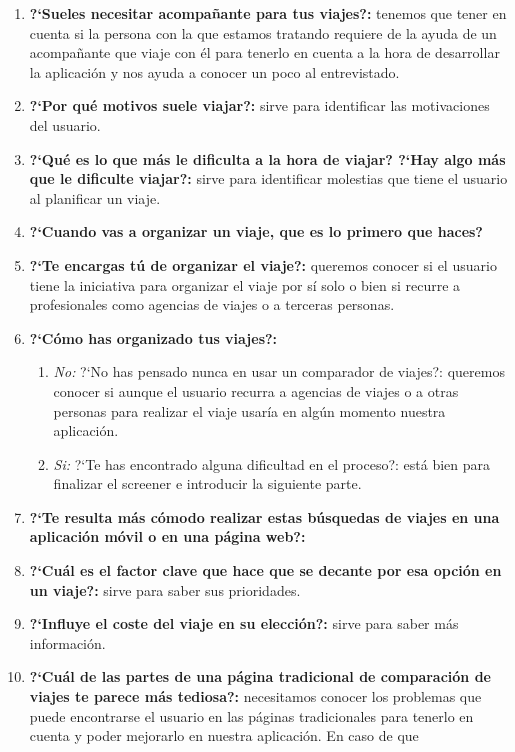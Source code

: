\begin{enumerate}
    \item {\textbf{?`Sueles necesitar acompañante para tus viajes?:}} tenemos que tener en cuenta si la persona con la que estamos tratando requiere de la
                ayuda de un acompañante que viaje con él para tenerlo en cuenta a la hora de desarrollar la aplicación y nos ayuda a conocer un poco al entrevistado.
    \item {\textbf{?`Por qué motivos suele viajar?:}} sirve para identificar las motivaciones del usuario.
    \item {\textbf{?`Qué es lo que más le dificulta a la hora de viajar? ?`Hay algo más que le dificulte viajar?:}} sirve para identificar molestias que tiene
                el usuario al planificar un viaje.
    \item {\textbf{?`Cuando vas a organizar un viaje, que es lo primero que haces?}}
    \item {\textbf{?`Te encargas tú de organizar el viaje?:}} queremos conocer si el usuario tiene la iniciativa para organizar el viaje por sí solo o bien si
                recurre a profesionales como agencias de viajes o a terceras personas.
    \item{ \textbf{?`Cómo has organizado tus viajes?:}}
    \begin{enumerate}
        \item {\textit{No:}} ?`No has pensado nunca en usar un comparador de viajes?: queremos conocer si aunque el usuario recurra a agencias de viajes o
                        a otras personas para realizar el viaje usaría en algún momento nuestra aplicación.
        \item {\textit{Si:}} ?`Te has encontrado alguna dificultad en el proceso?: está bien para finalizar el screener e introducir la siguiente parte.
    \end{enumerate}
    \item {\textbf{?`Te resulta más cómodo realizar estas búsquedas de viajes en una aplicación móvil o en una página web?:}}
    \item {\textbf{?`Cuál es el factor clave que hace que se decante por esa opción en un viaje?:}} sirve para saber sus prioridades.
    \item {\textbf{?`Influye el coste del viaje en su elección?:}} sirve para saber más información.
    \item {\textbf{?`Cuál de las partes de una página tradicional de comparación de viajes te parece más tediosa?:}} necesitamos conocer los problemas que
                puede encontrarse el usuario en las páginas tradicionales para tenerlo en cuenta y poder mejorarlo en nuestra aplicación. En caso de que

\end{enumerate}

